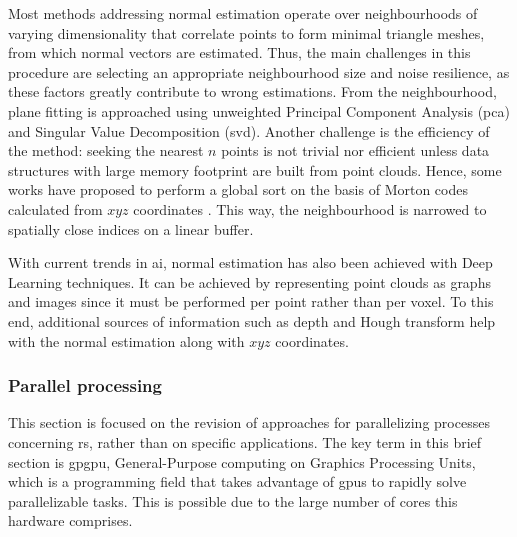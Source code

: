 Most methods addressing normal estimation operate over neighbourhoods of varying dimensionality that correlate points to form minimal triangle meshes, from which normal vectors are estimated. Thus, the main challenges in this procedure are selecting an appropriate neighbourhood size and noise resilience, as these factors greatly contribute to wrong estimations. From the neighbourhood, plane fitting is approached using unweighted Principal Component Analysis (\acrshort{pca}) and Singular Value Decomposition (\acrshort{svd}). Another challenge is the efficiency of the method: seeking the nearest $n$ points is not trivial nor efficient unless data structures with large memory footprint are built from point clouds. Hence, some works have proposed to perform a global sort on the basis of Morton codes calculated from $\textit{xyz}$ coordinates \cite{jakob_optimizing_2021}. This way, the neighbourhood is narrowed to spatially close indices on a linear buffer.

With current trends in \acrshort{ai}, normal estimation has also been achieved with Deep Learning techniques. It can be achieved by representing point clouds as graphs \cite{lenssen_deep_2020} and images \cite{zeng_deep_2019, boulch_deep_2016} since it must be performed per point rather than per voxel. To this end, additional sources of information such as depth and Hough transform \cite{boulch_deep_2016} help with the normal estimation along with $\textit{xyz}$ coordinates. 

\subsubsection{Parallel processing}

This section is focused on the revision of approaches for parallelizing processes concerning \acrshort{rs}, rather than on specific applications. The key term in this brief section is \acrshort{gpgpu}, General-Purpose computing on Graphics Processing Units, which is a programming field that takes advantage of \acrshort{gpu}s to rapidly solve parallelizable tasks. This is possible due to the large number of cores this hardware comprises. 

